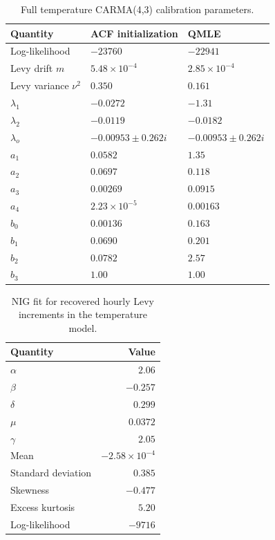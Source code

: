 \begin{table}[H]
  \centering
  \caption{Full temperature CARMA(4,3) calibration parameters.}
  \label{tab:app-temperature-carma-params}
  \small
  \begin{tabular}{@{}lll@{}}
    \toprule
    Quantity & ACF initialization & QMLE \\
    \midrule
    Log-likelihood & \(-23760\) & \(-22941\) \\
    Levy drift \(m\) & \(5.48{\times}10^{-4}\) & \(2.85{\times}10^{-4}\) \\
    Levy variance \(\nu^2\) & \(0.350\) & \(0.161\) \\
    \midrule
    \(\lambda_1\) & \(-0.0272\) & \(-1.31\) \\
    \(\lambda_2\) & \(-0.0119\) & \(-0.0182\) \\
    \(\lambda_o\) & \(-0.00953\pm0.262i\) & \(-0.00953\pm0.262i\) \\
    \midrule
    \(a_1\) & \(0.0582\) & \(1.35\) \\
    \(a_2\) & \(0.0697\) & \(0.118\) \\
    \(a_3\) & \(0.00269\) & \(0.0915\) \\
    \(a_4\) & \(2.23{\times}10^{-5}\) & \(0.00163\) \\
    \midrule
    \(b_0\) & \(0.00136\) & \(0.163\) \\
    \(b_1\) & \(0.0690\) & \(0.201\) \\
    \(b_2\) & \(0.0782\) & \(2.57\) \\
    \(b_3\) & \(1.00\) & \(1.00\) \\
    \bottomrule
  \end{tabular}
\end{table}



\begin{table}[H]
  \centering
  \caption{NIG fit for recovered hourly Levy increments in the temperature model.}
  \label{tab:app-temperature-nig-params}
  \small
  \begin{tabular}{@{}lr@{}}
    \toprule
    Quantity & Value \\
    \midrule
    \(\alpha\) & \(2.06\) \\
    \(\beta\) & \(-0.257\) \\
    \(\delta\) & \(0.299\) \\
    \(\mu\) & \(0.0372\) \\
    \(\gamma\) & \(2.05\) \\
    Mean & \(-2.58{\times}10^{-4}\) \\
    Standard deviation & \(0.385\) \\
    Skewness & \(-0.477\) \\
    Excess kurtosis & \(5.20\) \\
    Log-likelihood & \(-9716\) \\
    \bottomrule
  \end{tabular}
\end{table}



